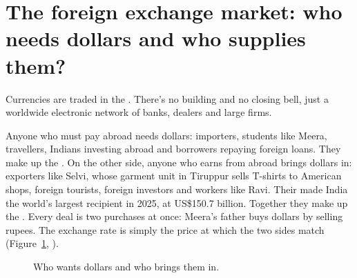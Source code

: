 \section{The foreign exchange market: who needs dollars and who supplies them?}\label{sec:forex}

Currencies are traded in the . There's no building and no closing bell, just a worldwide electronic network of banks, dealers and large firms.\cite{greenlaw2022}

Anyone who must pay abroad needs dollars: importers, students like Meera, travellers, Indians investing abroad and borrowers repaying foreign loans. They make up the . On the other side, anyone who earns from abroad brings dollars in: exporters like Selvi, whose garment unit in Tiruppur sells T-shirts to American shops, foreign tourists, foreign investors and workers like Ravi. Their  made India the world's largest recipient in 2025, at US\$150.7 billion.\cite{wb2026a} Together they make up the .\cite{ncert2007} Every deal is two purchases at once: Meera's father buys dollars by selling rupees.\cite{greenlaw2022} The exchange rate is simply the price at which the two sides match (Figure~\ref{fig:m1-flow}, ).

\begin{figure}[!htb]
  \centering
  \resizebox{\linewidth}{!}{}
  \caption{Who wants dollars and who brings them in.}
  \label{fig:m1-flow}
\end{figure}

